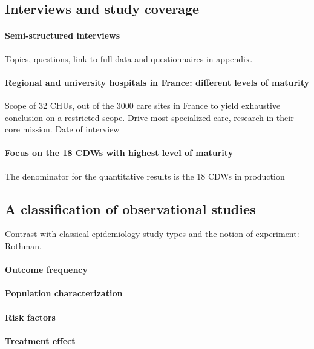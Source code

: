 \documentclass{report}
\begin{document}
\subsection{Interviews and study coverage}\label{subsec:cdw:interviews}

\paragraph{Semi-structured interviews}

Topics, questions, link to full data and questionnaires in appendix.

\paragraph{Regional and university hospitals in France: different levels of maturity}

Scope of 32 CHUs, out of the 3000 care sites in France to yield exhaustive
conclusion on a restricted scope. Drive most specialized care, research in their
core mission. Date of interview

\paragraph{Focus on the 18 CDWs with highest level of maturity}

The denominator for the quantitative results is the 18 CDWs in production

\subsection{A classification of observational studies}\label{subsec:cdw:classification}

Contrast with classical epidemiology study types and the notion of experiment: Rothman.
\paragraph{Outcome frequency}
\paragraph{Population characterization}
\paragraph{Risk factors}
\paragraph{Treatment effect}
\end{document}
